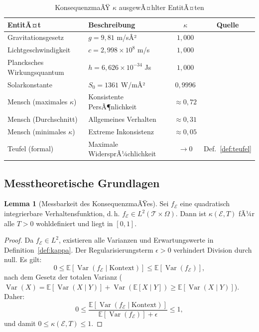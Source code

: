 ﻿\documentclass[a4paper,12pt]{article}
\DeclareMathOperator{\Var}{Var}
\theoremstyle{definition}
\newtheorem{lemma}{Lemma}
\begin{document}
\begin{table}[H]
\centering
\caption{KonsequenzmaÃŸ $\kappa$ ausgewÃ¤hlter EntitÃ¤ten}
\label{tab:kappa}
\begin{tabular}{llcc}
\toprule
\textbf{EntitÃ¤t} & \textbf{Beschreibung} & $\kappa$ & \textbf{Quelle} \\
\midrule
Gravitationsgesetz & $g = 9{,}81$ m/sÂ² & $1{,}000$ & \cite{mohr2018} \\
Lichtgeschwindigkeit & $c = 2{,}998 \times 10^8$ m/s & $1{,}000$ & \cite{mohr2018} \\
Plancksches Wirkungsquantum & $h = 6{,}626 \times 10^{-34}$ Js & $1{,}000$ & \cite{mohr2018} \\
Solarkonstante & $S_0 = 1361$ W/mÂ² & $0{,}9996$ & \cite{kopp2011} \\
Mensch (maximales $\kappa$) & Konsistente PersÃ¶nlichkeit & $\approx 0{,}72$ & \cite{kahneman2011} \\
Mensch (Durchschnitt) & Allgemeines Verhalten & $\approx 0{,}31$ & \cite{ariely2008} \\
Mensch (minimales $\kappa$) & Extreme Inkonsistenz & $\approx 0{,}05$ & \cite{ariely2008} \\
Teufel (formal) & Maximale WidersprÃ¼chlichkeit & $\to 0$ & Def.~\ref{def:teufel} \\
\bottomrule
\end{tabular}
\end{table}

\subsection{Messtheoretische Grundlagen}

\begin{lemma}[Messbarkeit des KonsequenzmaÃŸes]
\label{lem:messbar}
Sei $f_{\mathcal{E}}$ eine quadratisch integrierbare Verhaltensfunktion, d.\,h. $f_{\mathcal{E}} \in L^2(\mathcal{T} \times \Omega)$. Dann ist $\kappa(\mathcal{E}, T)$ fÃ¼r alle $T > 0$ wohldefiniert und liegt in $[0,1]$.
\end{lemma}

\begin{proof}
Da $f_{\mathcal{E}} \in L^2$, existieren alle Varianzen und Erwartungswerte in Definition~\ref{def:kappa}. Der Regularisierungsterm $\epsilon > 0$ verhindert Division durch null. Es gilt:
\[
0 \leq \mathbb{E}[\Var(f_{\mathcal{E}} \mid \text{Kontext})] \leq \mathbb{E}[\Var(f_{\mathcal{E}})],
\]
nach dem Gesetz der totalen Varianz ($\Var(X) = \mathbb{E}[\Var(X \mid Y)] + \Var(\mathbb{E}[X \mid Y]) \geq \mathbb{E}[\Var(X \mid Y)]$). Daher:
\[
0 \leq \frac{\mathbb{E}[\Var(f_{\mathcal{E}} \mid \text{Kontext})]}{\mathbb{E}[\Var(f_{\mathcal{E}})] + \epsilon} \leq 1,
\]
und damit $0 \leq \kappa(\mathcal{E}, T) \leq 1$. \qedhere
\end{proof}
\end{document}
